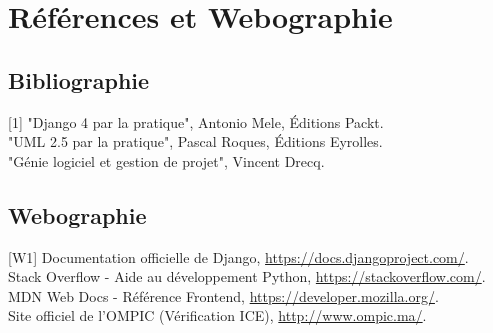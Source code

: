 \documentclass[12pt,a4paper]{report}
\begin{document}
\chapter*{Références et Webographie}

\section*{Bibliographie}
[1] "Django 4 par la pratique", Antonio Mele, Éditions Packt. \\
[2] "UML 2.5 par la pratique", Pascal Roques, Éditions Eyrolles. \\
[3] "Génie logiciel et gestion de projet", Vincent Drecq.

\section*{Webographie}
[W1] Documentation officielle de Django, \url{https://docs.djangoproject.com/}. \\
[W2] Stack Overflow - Aide au développement Python, \url{https://stackoverflow.com/}. \\
[W3] MDN Web Docs - Référence Frontend, \url{https://developer.mozilla.org/}. \\
[W4] Site officiel de l'OMPIC (Vérification ICE), \url{http://www.ompic.ma/}.
\end{document}
